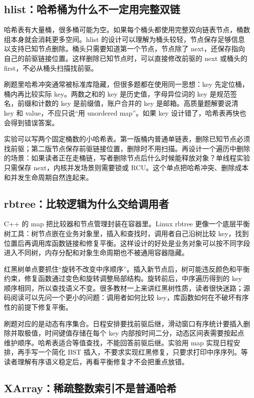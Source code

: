 \subsection{hlist：哈希桶为什么不一定用完整双链}

哈希表有大量桶，很多桶可能为空。如果每个桶头都使用完整双向链表节点，桶数组本身就会消耗更多空间。hlist 的设计可以理解为桶头较轻，节点保存足够信息以支持已知节点删除。桶头只需要知道第一个节点，节点除了 next，还保存指向自己的前驱链接位置。这样删除已知节点时，可以直接修改前驱的 next 或桶头的 first，不必从桶头扫描找前驱。

刷题里哈希冲突通常被标准库隐藏，但很多题都在使用同一思想：key 先定位桶，桶内再比较实际 key。两数之和的 key 是历史值，字母异位词的 key 是规范签名，前缀和计数的 key 是前缀值，账户合并的 key 是邮箱。高质量题解要说清 key 和 value，不应只说“用 unordered map”。如果 key 设计错了，哈希表再快也会得到错误答案。

实验可以写两个固定桶数的小哈希表。第一版桶内普通单链表，删除已知节点必须找前驱；第二版节点保存前驱链接位置，删除时不用扫描。再设计一个遍历中删除的场景：如果读者正在走桶链，写者删除节点后什么时候能释放对象？单线程实验只需保存 next，内核并发场景则需要锁或 RCU。这个单点把哈希冲突、删除成本和并发生命周期自然连起来。

\subsection{rbtree：比较逻辑为什么交给调用者}

C++ 的 map 把比较器和节点管理封装在容器里。Linux rbtree 更像一个底层平衡树工具：树节点嵌在业务对象里，插入和查找时，调用者自己沿树比较 key，找到位置后再调用库函数链接和修复平衡。这样设计的好处是业务对象可以按不同字段进入不同树，内存分配和对象生命周期也不被通用容器隐藏。

红黑树单点要抓住“旋转不改变中序顺序”。插入新节点后，树可能违反颜色和平衡约束，修复函数通过变色和旋转调整局部结构。旋转前后，中序遍历得到的 key 顺序相同，所以查找语义不变。很多教材一上来讲红黑树性质，读者很快迷路；源码阅读可以先问一个更小的问题：调用者如何比较 key，库函数如何在不破坏有序性的前提下修复平衡。

刷题对应的是动态有序集合。日程安排要找前驱后继，滑动窗口有序统计要插入删除并取极值，时间键值存储在每个 key 内部按时间二分，动态区间表需要按起点维护顺序。哈希表适合等值查找，不能回答前驱后继。实验用 map 实现日程安排，再手写一个简化 BST 插入，不要求实现红黑修复，只要求打印中序序列。等读者理解有序语义稳定后，再看平衡修复才不会把重点放错。

\subsection{XArray：稀疏整数索引不是普通哈希}

